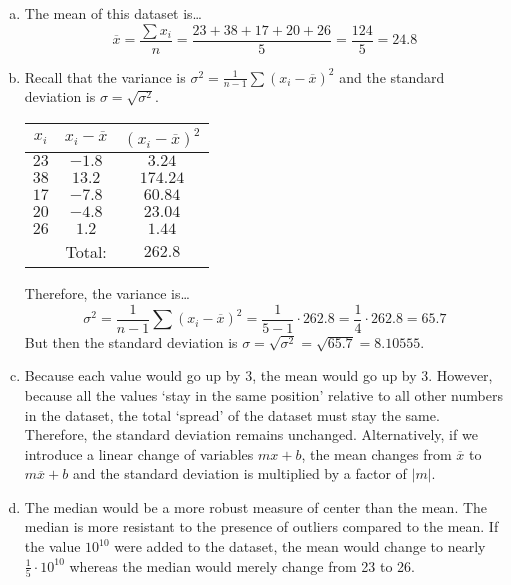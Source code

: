 \documentclass[11pt,letterpaper]{article}
\begin{document}
\sol 
\begin{enumerate}[(a)]
\item The mean of this dataset is\dots
	\[
	\overline{x}= \dfrac{\sum x_i}{n}= \dfrac{23 + 38 + 17 + 20 + 26}{5}= \dfrac{124}{5}= 24.8
	\]

\item Recall that the variance is $\sigma^2= \frac{1}{n - 1} \sum (x_i - \overline{x})^2$ and the standard deviation is $\sigma= \sqrt{\sigma^2}$. \par
	\begin{table}[h]
	\centering
	\begin{tabular}{ccc}
	$x_i$ & $x_i - \overline{x}$ & $(x_i - \overline{x})^2$ \\ \hline
	$23$ & $-1.8$ & $3.24$ \\
	$38$ & $13.2$ & $174.24$ \\
	$17$ & $-7.8$ & $60.84$ \\
	$20$ & $-4.8$ & $23.04$ \\
	$26$ & $1.2$ & $1.44$ \\ \hline
	& Total: & $262.8$
	\end{tabular}
	\end{table}
Therefore, the variance is\dots
	\[
	\sigma^2= \dfrac{1}{n - 1} \sum (x_i - \overline{x})^2= \dfrac{1}{5 - 1} \cdot 262.8= \dfrac{1}{4} \cdot 262.8= 65.7
	\]
But then the standard deviation is $\sigma= \sqrt{\sigma^2}= \sqrt{65.7}= 8.10555$. \pspace

\item Because each value would go up by 3, the mean would go up by 3. However, because all the values `stay in the same position' relative to all other numbers in the dataset, the total `spread' of the dataset must stay the same. Therefore, the standard deviation remains unchanged. Alternatively, if we introduce a linear change of variables $mx + b$, the mean changes from $\overline{x}$ to $m \overline{x} + b$ and the standard deviation is multiplied by a factor of $|m|$. \pspace

\item The median would be a more robust measure of center than the mean. The median is more resistant to the presence of outliers compared to the mean. If the value $10^{10}$ were added to the dataset, the mean would change to nearly $\frac{1}{5} \cdot 10^{10}$ whereas the median would merely change from 23 to 26. 
\end{enumerate}
\end{document}

